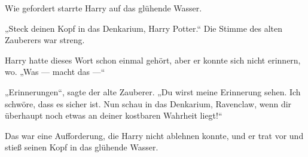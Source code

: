 Wie gefordert starrte Harry auf das glühende Wasser.

„Steck deinen Kopf in das Denkarium, Harry Potter.“
Die Stimme des alten Zauberers war streng.

Harry hatte dieses Wort schon einmal gehört, aber er konnte sich nicht erinnern, wo.
„Was — macht das —“

„Erinnerungen“, sagte der alte Zauberer.
„Du wirst meine Erinnerung sehen. Ich schwöre, dass es sicher ist. Nun schau in das Denkarium, Ravenclaw, wenn dir überhaupt noch etwas an deiner kostbaren Wahrheit liegt!“

Das war eine Aufforderung, die Harry nicht ablehnen konnte, und er trat vor und stieß seinen Kopf in das glühende Wasser.

\later

